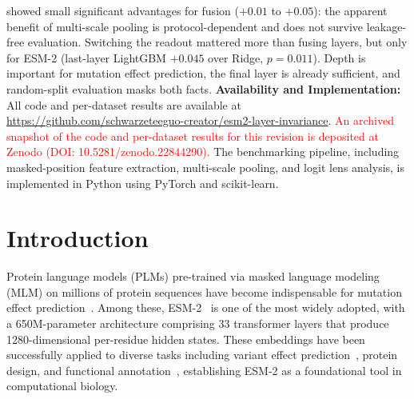\documentclass[numbered,webpdf,modern,large]{oup-authoring-template}
\newcommand{\rev}[1]{\textcolor{red}{#1}}
\begin{document}
{{showed small significant advantages for fusion ($+0.01$ to $+0.05$): the
apparent benefit of multi-scale pooling is protocol-dependent and does not
survive leakage-free evaluation.
Switching the readout mattered more than fusing layers, but only for ESM-2
(last-layer LightGBM $+0.045$ over Ridge, $p = 0.011$). Depth is important
for mutation effect
prediction, the final layer is already sufficient, and random-split
evaluation masks both facts.}
\textbf{Availability and Implementation:} All code and per-dataset results are
available at \url{https://github.com/schwarzeteeguo-creator/esm2-layer-invariance}.
\rev{An archived snapshot of the code and per-dataset results for this revision is
deposited at Zenodo (DOI: 10.5281/zenodo.22844290).} The benchmarking pipeline,
including masked-position feature extraction, multi-scale pooling, and logit lens
analysis, is implemented in Python using PyTorch and scikit-learn.}

\maketitle

\section{Introduction}

Protein language models (PLMs) pre-trained via masked language modeling (MLM) on
millions of protein sequences have become indispensable for mutation effect
prediction~\cite{rives2021biological,meier2021language,lin2023evolutionary}.
Among these, ESM-2~\cite{lin2023evolutionary}
is one of the most widely adopted, with a 650M-parameter architecture comprising 33
transformer layers that produce 1280-dimensional per-residue hidden states. These
embeddings have been successfully applied to diverse tasks including variant effect
prediction~\cite{frazer2021disease,hie2021learning}, protein design, and functional
annotation~\cite{elnaggar2022prottrans,brandes2022proteinbert}, establishing ESM-2 as a
foundational tool in computational biology.
\end{document}
